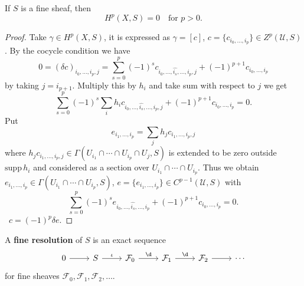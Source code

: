 \documentclass[12pt]{article}
\begin{document}
\begin{theorem}
  If \(S\) is a fine sheaf, then \[
    H^{p}(X,S)=0\quad \text{for }p>0
  .\] 
\end{theorem}
\begin{proof}
  Take \(\gamma\in H^p(X,S)\), it is expressed as \(\gamma=[c]\), \(c=\{c_{i_0,\ldots,
  i_p}\}\in Z^p(\mathcal{U},S)\). By the cocycle condition we have \[
  0=(\delta c)_{i_0,\ldots,i_p,j}=\sum_{s=0}^{p}(-1)^s c_{i_0,\ldots,\widehat{i_s},
  \ldots,i_p,j}+(-1)^{p+1}c_{i_0,\ldots,i_p}
  \] by taking \(j=i_{p+1}\). Multiply this by \(h_i\) and take sum with respect to
  \(j\) we get \[
    \sum_{s=0}^{p}(-1)^s \sum_i h_i c_{i_0,\ldots,\widehat{i_s},\ldots,i_p,j}
    +(-1)^{p+1}c_{i_0,\ldots,i_p}=0
  .\] Put \[
    e_{i_1,\ldots,i_p}=\sum_j h_j c_{i_1,\ldots,i_p,j}
  \] where \(h_j c_{i_1,\ldots,i_p,j}\in \Gamma(U_{i_1}\cap\cdots\cap U_{i_p}\cap U_j,
  S)\) is extended to be zero outside \(\mathrm{supp}\,h_i\) and considered as a
  section over \(U_{i_1}\cap\cdots\cap U_{i_p}\). Thus we obtain \(e_{i_1,\ldots,i_p}
  \in \Gamma(U_{i_1}\cap\cdots\cap U_{i_p},S)\), \(e=\{e_{i_1,\ldots,i_p}\}\in C^{p-1}
  (\mathcal{U},S)\) with \[
    \sum_{s=0}^{p}(-1)^s e_{i_0,\ldots,\widehat{i_s},\ldots,i_p}+
    (-1)^{p+1}c_{i_0,\ldots,i_p}=0
  .\] \ie\ \(c=(-1)^{p}\delta e\).
\end{proof}

\begin{definition}
  A \textbf{fine resolution} of \(S\) is an exact sequence
  \[\begin{tikzcd}
    0 \arrow[r] & S \arrow[r,"\iota"] & \mathcal{F}_0 \arrow[r,"\dd"]
    & \mathcal{F}_1 \arrow[r,"\dd"] & \mathcal{F}_2 \arrow[r] & \cdots
  \end{tikzcd}\] 
  for fine sheaves \(\mathcal{F}_0,\mathcal{F}_1,\mathcal{F}_2,\ldots\).
\end{definition}
\end{document}
